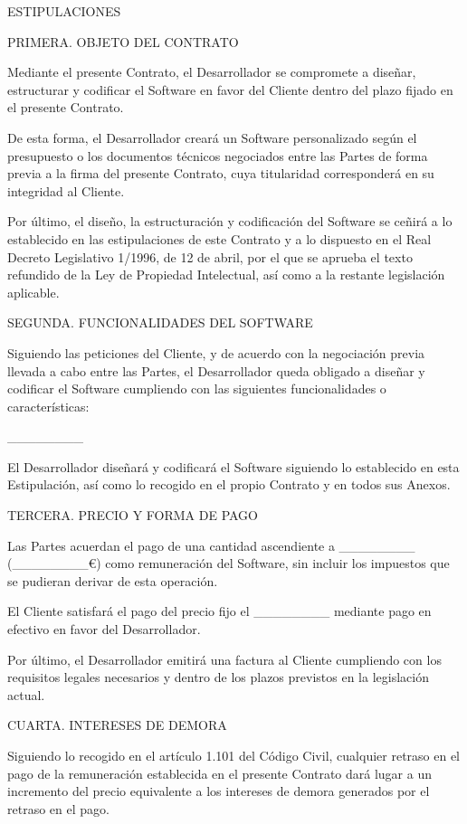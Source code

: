 \documentclass[a4paper,11pt]{report}
\begin{document}
ESTIPULACIONES

PRIMERA. OBJETO DEL CONTRATO

Mediante el presente Contrato, el Desarrollador se compromete a diseñar,
estructurar y codificar el Software en favor del Cliente dentro del
plazo fijado en el presente Contrato.

De esta forma, el Desarrollador creará un Software personalizado según
el presupuesto o los documentos técnicos negociados entre las Partes de
forma previa a la firma del presente Contrato, cuya titularidad
corresponderá en su integridad al Cliente.

Por último, el diseño, la estructuración y codificación del Software se
ceñirá a lo establecido en las estipulaciones de este Contrato y a lo
dispuesto en el Real Decreto Legislativo 1/1996, de 12 de abril, por el
que se aprueba el texto refundido de la Ley de Propiedad Intelectual,
así como a la restante legislación aplicable.

SEGUNDA. FUNCIONALIDADES DEL SOFTWARE

Siguiendo las peticiones del Cliente, y de acuerdo con la negociación
previa llevada a cabo entre las Partes, el Desarrollador queda obligado
a diseñar y codificar el Software cumpliendo con las siguientes
funcionalidades o características:

\_\_\_\_\_\_\_\_

El Desarrollador diseñará y codificará el Software siguiendo lo
establecido en esta Estipulación, así como lo recogido en el propio
Contrato y en todos sus Anexos.

TERCERA. PRECIO Y FORMA DE PAGO

Las Partes acuerdan el pago de una cantidad ascendiente a \_\_\_\_\_\_\_\_
(\_\_\_\_\_\_\_\_€) como remuneración del Software, sin incluir los impuestos
que se pudieran derivar de esta operación.

El Cliente satisfará el pago del precio fijo el \_\_\_\_\_\_\_\_ mediante pago
en efectivo en favor del Desarrollador.

Por último, el Desarrollador emitirá una factura al Cliente cumpliendo
con los requisitos legales necesarios y dentro de los plazos previstos
en la legislación actual.

CUARTA. INTERESES DE DEMORA

Siguiendo lo recogido en el artículo 1.101 del Código Civil, cualquier
retraso en el pago de la remuneración establecida en el presente
Contrato dará lugar a un incremento del precio equivalente a los
intereses de demora generados por el retraso en el pago.
\end{document}
